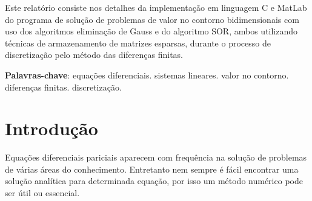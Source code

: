\documentclass[
	article,			%
	11pt,				%
	oneside,			%
	a4paper,			%
	english,			%
	brazil,				%
	sumario=tradicional
	]{abntex2}
\begin{document}

\frenchspacing 


%
%
\maketitle

\begin{resumoumacoluna}
 Este relatório consiste nos detalhes da implementação em linguagem C e MatLab do programa de solução de problemas de valor no contorno bidimensionais com uso dos algoritmos eliminação de Gauss e do algoritmo SOR, ambos utilizando técnicas de armazenamento de matrizes esparsas, durante o processo de discretização pelo método das diferenças finitas. 
 
 \vspace{\onelineskip}
 
 \noindent
 \textbf{Palavras-chave}: equações diferenciais. sistemas lineares. valor no contorno. diferenças finitas. discretização.
\end{resumoumacoluna}


\textual

\section*{Introdução}

Equações diferenciais pariciais aparecem com frequência na solução de problemas de várias áreas do conhecimento. Entretanto nem sempre é fácil encontrar uma solução analítica para determinada equação, por isso um método numérico pode ser útil ou essencial. 
\end{document}
